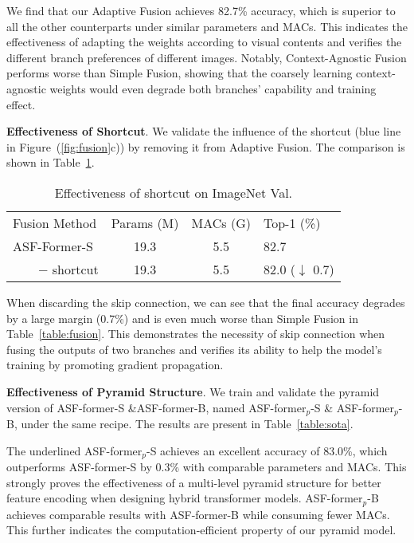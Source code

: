 \documentclass[lettersize,journal]{IEEEtran}
\begin{document}
We find that our Adaptive Fusion achieves 82.7\% accuracy, which is superior to all the other counterparts under similar parameters and MACs. This indicates the effectiveness of adapting the weights according to visual contents and verifies the different branch preferences of different images. Notably, Context-Agnostic Fusion performs worse than Simple Fusion, showing that the coarsely learning context-agnostic weights would even degrade both branches' capability and training effect.

\textbf{Effectiveness of Shortcut}. We validate the influence of the shortcut ({\color{blue}blue} line in Figure~(\ref{fig:fusion}c)) by removing it from Adaptive Fusion. The comparison is shown in Table~\ref{table:shortcut}.
\setlength{\tabcolsep}{4pt}
\begin{table}[th]
\begin{center}
\caption{Effectiveness of shortcut on ImageNet Val.}
\label{table:shortcut}
\begin{tabular}{lccl}
\hline\noalign{\smallskip}
Fusion Method &Params (M)&MACs (G) &Top-1 (\%)\\
\noalign{\smallskip}
\hline
\noalign{\smallskip}
ASF-Former-S & 19.3 & 5.5 & 82.7 \\
~~~~$-$ shortcut & 19.3 & 5.5 & 82.0 ($\downarrow$ 0.7) \\
\hline
\end{tabular}
\end{center}
\end{table}
\setlength{\tabcolsep}{1.4pt}

When discarding the skip connection, we can see that the final accuracy degrades by a large margin (0.7\%) and is even much worse than Simple Fusion in Table~\ref{table:fusion}. This demonstrates the necessity of skip connection when fusing the outputs of two branches and verifies its ability to help the model's training by promoting gradient propagation.

\textbf{Effectiveness of Pyramid Structure}. We train and validate the pyramid version of ASF-former-S \&ASF-former-B, named ASF-former$_p$-S \& ASF-former$_p$-B, under the same recipe. The results are present in Table~\ref{table:sota}.

The underlined ASF-former$_p$-S achieves an excellent accuracy of 83.0\%, which outperforms ASF-former-S by 0.3\% with comparable parameters and MACs. This strongly proves the effectiveness of a multi-level pyramid structure for better feature encoding when designing hybrid transformer models. ASF-former$_p$-B achieves comparable results with ASF-former-B while consuming fewer MACs. This further indicates the computation-efficient property of our pyramid model.
\end{document}
